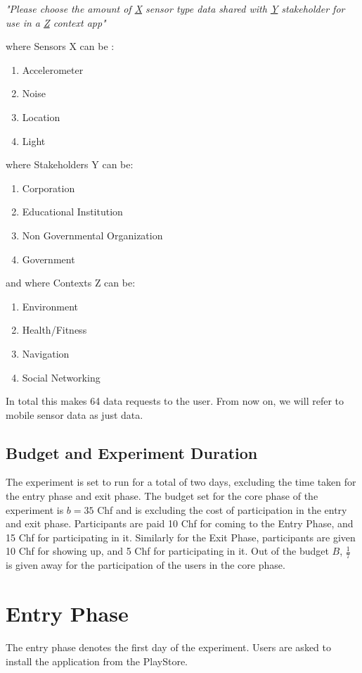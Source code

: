 \textit{"Please choose the amount of \underline{X} sensor type data shared with \underline{Y} stakeholder for use in a \underline{Z} context app"}

where Sensors X can be :
\begin{enumerate}
    \item Accelerometer
    \item Noise
    \item Location
    \item Light
\end{enumerate}
where Stakeholders Y can be:
\begin{enumerate}
    \item Corporation
    \item Educational Institution
    \item Non Governmental Organization
    \item Government
\end{enumerate}
and where Contexts Z can be:
\begin{enumerate}
    \item Environment
    \item Health/Fitness
    \item Navigation
    \item Social Networking
\end{enumerate}

In total this makes 64 data requests to the user. From now on, we will refer to mobile sensor data as just data.

\subsection{Budget and Experiment Duration}


The experiment is set to run for a total of two days, excluding the time taken for the entry phase and exit phase.
The budget set for the core phase of the experiment is $b=35$ Chf and is excluding the cost of participation
in the entry and exit phase. Participants are paid 10 Chf for coming to the Entry Phase, and 15 Chf for
participating in it. Similarly for the Exit Phase, participants are given 10 Chf for showing up, and 5 Chf for participating in it.
Out of the budget $B$, $\frac{1}{7}$ is given away for the participation of the users in the core phase.


\section{Entry Phase}
The entry phase denotes the first day of the experiment. Users are asked to install the application from the PlayStore. 

